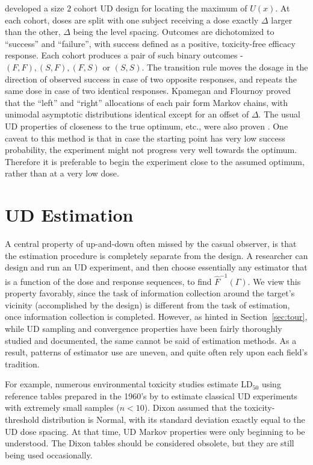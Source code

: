 \cite{Kpam:Flou:opti:2001} developed a size $2$ cohort UD design for locating the maximum of $U(x)$. At each cohort, doses are split with one subject receiving a dose  exactly $\Delta$ larger than the other, $\Delta$ being the level spacing. Outcomes are dichotomized to ``success'' and ``failure'', with success defined as a positive, toxicity-free efficacy response. Each cohort produces a pair of such binary outcomes - $(F,F),(S,F),(F,S)$ or $(S,S)$. The transition rule moves the dosage in the direction of observed success in case of two opposite responses, and repeats the same dose in case of two identical responses. Kpamegan and Flournoy proved that the ``left'' and ``right'' allocations of each pair form Markov chains, with unimodal asymptotic distributions identical except for an offset of $\Delta$. The usual UD properties of closeness to the true optimum, etc., were also proven \citep{Kpam:Flou:opti:2008}. One caveat to this method is that in case the starting point has very low success probability, the experiment might not progress very well towards the optimum. Therefore it is preferable to begin the experiment close to the assumed optimum, rather than at a very low dose.


\section{UD Estimation}\label{sec:est}

A central property of up-and-down often missed by the casual observer, is that the estimation procedure is completely separate from the design. A researcher can design and run an UD experiment, and then choose essentially any estimator that is a function of the dose and response sequences, to find $\hat{F}^{-1}(\Gamma)$. We view this property favorably, since the task of information collection around the target's vicinity (accomplished by the design) is different from the task of estimation, once information collection is completed. However, as hinted in Section~\ref{sec:tour}, while UD sampling and convergence properties have been fairly thoroughly studied and documented, the same cannot be said of estimation methods. As a result, patterns of estimator use are uneven, and quite often rely upon each field's tradition.

For example, numerous environmental toxicity studies \citep{Lich:updo:1998,Sund:Patr:Jull:Warn:Use:2004,Sween:etal:canines:2010} estimate LD$_{50}$ using reference tables prepared in the 1960's by \cite{Dixo:up-a:1965} to estimate classical UD experiments with extremely small samples ($n<10$). Dixon assumed that the toxicity-threshold distribution is Normal, with its standard deviation exactly equal to the UD dose spacing. At that time, UD Markov properties were only beginning to be understood. The Dixon tables should be considered obsolete, but they are still being used occasionally.

